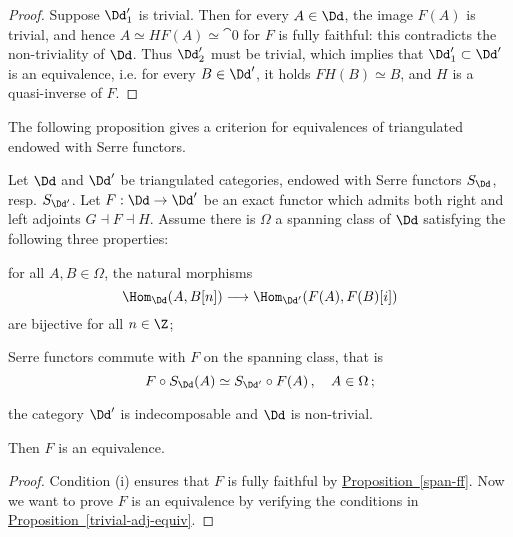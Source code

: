 \begin{prop}
\begin{proof}
        Suppose $\Dd'_{1}$ is trivial. Then for every $A \in \Dd$,
        the image $F(A)$ is trivial, and hence
        $A \simeq HF(A) \simeq \cat{0}$ for $F$ is fully faithful:
        this contradicts the non-triviality of $\Dd$.
        Thus $\Dd'_{2}$ must be trivial, which implies
        that $\Dd'_{1} \subset \Dd'$ is an equivalence, i.e.
        for every $B \in \Dd'$, it holds $FH(B) \simeq B$,
        and $H$ is a quasi-inverse of $F$.
    \end{proof}
\end{prop}

The following proposition gives a criterion for equivalences
of triangulated endowed with Serre functors.

\begin{cor}
    Let $\Dd$ and $\Dd'$ be triangulated categories,
    endowed with Serre functors $S_{\Dd}$, resp. $S_{\Dd'}$. 
    Let $F:\Dd \to \Dd'$ be an exact functor
    which admits both right 
    and left adjoints $G \dashv F \dashv H$. 
    Assume there is $\Omega$
    a spanning class of $\Dd$ satisfying the following three properties:
    \begin{rmnumerate}
        \item for all $A,B \in \Omega$, the natural morphisms
        \begin{equation*}
            \Hom_{\Dd}(A,B[n]) \longrightarrow \Hom_{\Dd'}(F(A),F(B)[i])
        \end{equation*}
        are bijective for all $n \in \Z$;
        
        \item Serre functors commute with $F$ on the spanning class,
        that is
        \begin{equation*}
            F \circ S_{\Dd}(A) \simeq S_{\Dd'} \circ F(A)\,, 
            \quad A \in \Omega \,;
        \end{equation*}

        \item the category $\Dd'$ is indecomposable and $\Dd$
        is non-trivial.
    \end{rmnumerate}
    Then $F$ is an equivalence.
    \begin{proof}
        Condition (i) ensures that $F$ is fully faithful by
        \hyperref[span-ff]{Proposition~\ref*{span-ff}}.
        Now we want to prove $F$ is an equivalence by verifying
        the conditions in \hyperref[trivial-adj-equiv]{Proposition~\ref*{trivial-adj-equiv}}.


\end{proof}
\end{cor}
